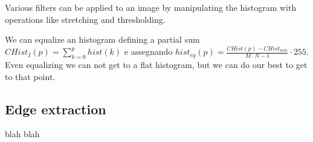 \documentclass{article}
\begin{document}
Various filters can be applied to an image by manipulating the histogram with operations like stretching and thresholding.

We can equalize an histogram defining a partial sum $CHist_I(p) = \sum_{k=0}^p hist(k)$ e assegnando $hist_{eq}(p) = \frac{CHist(p) - CHist_{min}}{M\cdot N -1} \cdot 255$.\\
Even equalizing we can not get to a flat histogram, but we can do our best to get to that point.

\subsection*{Edge extraction} blah blah
\end{document}
